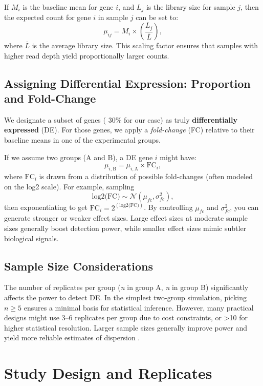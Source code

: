 \documentclass[12pt]{article}
\begin{document}
If $M_i$ is the baseline mean for gene $i$, and $L_j$ is the library size for sample $j$, then the expected count for gene $i$ in sample $j$ can be set to:
\[
\mu_{ij} = M_i \times \left(\frac{L_j}{\overline{L}}\right),
\]
where $\overline{L}$ is the average library size. This scaling factor ensures that samples with higher read depth yield proportionally larger counts.

\subsection{Assigning Differential Expression: Proportion and Fold-Change}
\label{subsec:deprop}
We designate a subset of genes ( 30\% for our case) as truly \textbf{differentially expressed} (DE). For those genes, we apply a \emph{fold-change} (FC) relative to their baseline means in one of the experimental groups.

If we assume two groups (A and B), a DE gene $i$ might have:
\[
\mu_{i, \text{B}} = \mu_{i, \text{A}} \times \text{FC}_i,
\]
where $\text{FC}_i$ is drawn from a distribution of possible fold-changes (often modeled on the log2 scale). For example, sampling
\[
\text{log2(FC)} \sim \mathcal{N}(\mu_{fc}, \sigma_{fc}^2),
\]
then exponentiating to get $\text{FC}_i = 2^{(\text{log2(FC)})}$. By controlling $\mu_{fc}$ and $\sigma_{fc}^2$, you can generate stronger or weaker effect sizes. Large effect sizes at moderate sample sizes generally boost detection power, while smaller effect sizes mimic subtler biological signals.

\subsection{Sample Size Considerations}
\label{subsec:samplesize}
The number of replicates per group (\emph{n} in group A, \emph{n} in group B) significantly affects the power to detect DE. In the simplest two-group simulation, picking $n \geq 5$ ensures a minimal basis for statistical inference. However, many practical designs might use 3--6 replicates per group due to cost constraints, or >10 for higher statistical resolution. Larger sample sizes generally improve power and yield more reliable estimates of dispersion .

\section{Study Design and Replicates}
\label{sec:studydesign}
\end{document}
